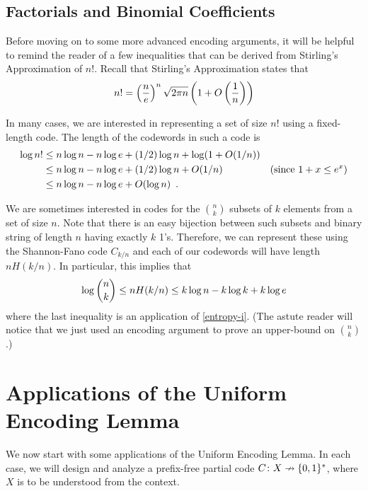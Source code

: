\documentclass{patmorin}
\begin{document}
\subsection{Factorials and Binomial Coefficients}

Before moving on to some more advanced encoding arguments, it will
be helpful to remind the reader of a few inequalities that can be
derived from Stirling's Approximation of $n!$.  Recall that Stirling's
Approximation states that
\begin{equation}
  n! = \left(\frac{n}{e}\right)^n\sqrt{2\pi n}\left(1+O\left(\frac{1}{n}\right)\right) 
   \eqlabel{stirling}
\end{equation}

In many cases, we are interested in representing a set of size $n!$
using a fixed-length code.  The length of the codewords in such a code is
\begin{align}
  \log n!
  & \le n\log n - n\log e + (1/2)\log n + \log(1+O(1/n)) \notag \\
  & \le n\log n - n\log e + (1/2)\log n + O(1/n)
  & \text{(since $1+x \le e^x$)} \notag \\
  & \le n\log n - n\log e + O(\log n) \eqlabel{stirling-loose}
  \enspace .
\end{align}

We are sometimes interested in codes for the $\binom{n}{k}$ subsets of
$k$ elements from a set of size $n$.  Note that there is an easy
bijection between such subsets and binary string of length $n$ having
exactly $k$ 1's. Therefore, we can represent these using the
Shannon-Fano code $C_{k/n}$ and each of our codewords will have length
$nH(k/n)$.  In particular, this implies that
\begin{equation}
  \log\binom{n}{k} \le nH(k/n) \le k\log n - k\log k + k\log e 
  \eqlabel{log-n-choose-k}
\end{equation}
where the last inequality is an application of \eqref{entropy-i}. (The
astute reader will notice that we just used an encoding argument to
prove an upper-bound on $\binom{n}{k}$.)

\section{Applications of the Uniform Encoding Lemma}

We now start with some applications of the Uniform Encoding Lemma. In
each case, we will design and analyze a prefix-free partial code
$C\colon X\nrightarrow \{0, 1\}^*$, where $X$ is to be understood from
the context.
\end{document}
